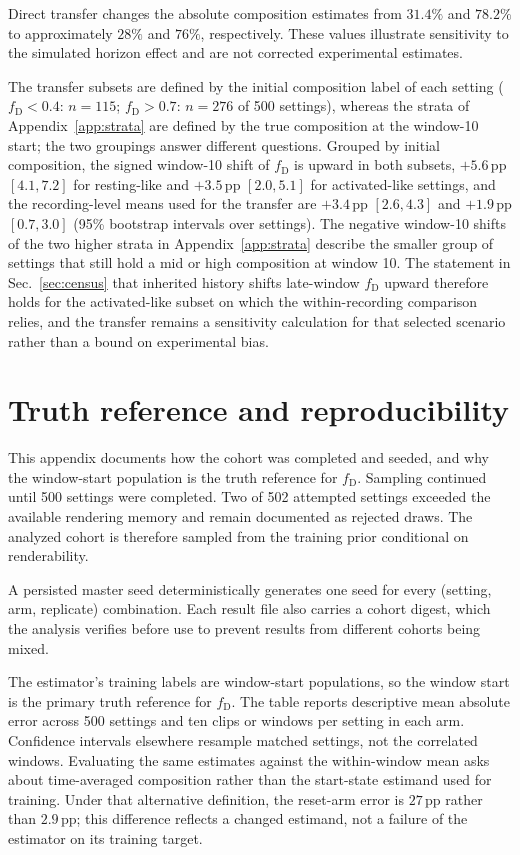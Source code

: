 \documentclass{article}
\newcommand{\fD}{f_{\mathrm{D}}}
\newcommand{\pp}{\,\mathrm{pp}}
\begin{document}
Direct transfer changes the absolute composition estimates from $31.4\%$
and $78.2\%$ to approximately $28\%$ and $76\%$, respectively. These values
illustrate sensitivity to the simulated horizon effect and are not corrected
experimental estimates.

The transfer subsets are defined by the initial composition label of each
setting ($\fD<0.4$: $n=115$; $\fD>0.7$: $n=276$ of 500 settings), whereas
the strata of Appendix~\ref{app:strata} are defined by the true composition at
the window-10 start; the two groupings answer different questions. Grouped by
initial composition, the signed window-10 shift of $\fD$ is upward in both
subsets, $+5.6\pp$ $[4.1,7.2]$ for resting-like and $+3.5\pp$ $[2.0,5.1]$
for activated-like settings, and the recording-level means used for the
transfer are $+3.4\pp$ $[2.6,4.3]$ and $+1.9\pp$ $[0.7,3.0]$ (95\%
bootstrap intervals over settings). The negative window-10 shifts of the two
higher strata in Appendix~\ref{app:strata} describe the smaller group of
settings that still hold a mid or high composition at window 10. The
statement in Sec.~\ref{sec:census} that inherited history shifts late-window
$\fD$ upward therefore holds for the activated-like subset on which the
within-recording comparison relies, and the transfer remains a sensitivity
calculation for that selected scenario rather than a bound on experimental
bias.

\section{Truth reference and reproducibility}
\label{app:truthref}

This appendix documents how the cohort was completed and seeded, and why the
window-start population is the truth reference for $\fD$. Sampling continued
until 500 settings were completed. Two of 502 attempted
settings exceeded the available rendering memory and remain documented as
rejected draws. The analyzed cohort is therefore sampled from the training
prior conditional on renderability.

A persisted master seed deterministically generates one seed for every
(setting, arm, replicate) combination. Each result file also carries a cohort
digest, which the analysis verifies before use to prevent results from
different cohorts being mixed.

The estimator's training labels are window-start populations, so the window
start is the primary truth reference for $\fD$. The table reports descriptive
mean absolute error across 500 settings and ten clips or windows per setting in
each arm. Confidence intervals elsewhere resample matched settings, not the
correlated windows. Evaluating the same estimates against the
within-window mean asks about time-averaged composition rather than the
start-state estimand used for training. Under that alternative definition, the reset-arm error is $27\pp$ rather
than $2.9\pp$; this difference reflects a changed estimand, not a failure of
the estimator on its training target.
\end{document}
